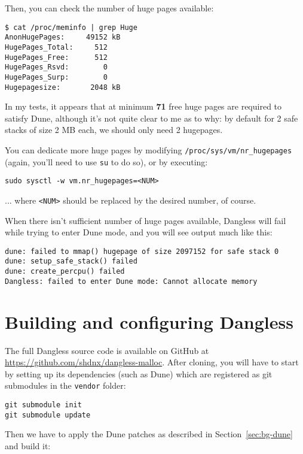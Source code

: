 Then, you can check the number of huge pages available:

\begin{verbatim}
$ cat /proc/meminfo | grep Huge
AnonHugePages:     49152 kB
HugePages_Total:     512
HugePages_Free:      512
HugePages_Rsvd:        0
HugePages_Surp:        0
Hugepagesize:       2048 kB
\end{verbatim}

In my tests, it appears that at minimum \textbf{71} free huge pages are required to satisfy Dune, although it's not quite clear to me as to why: by default for 2 safe stacks of size 2 MB each, we should only need 2 hugepages.

You can dedicate more huge pages by modifying \texttt{/proc/sys/vm/nr\_hugepages} (again, you'll need to use \texttt{su} to do so), or by executing:

\begin{verbatim}
sudo sysctl -w vm.nr_hugepages=<NUM>
\end{verbatim}

... where \texttt{<NUM>} should be replaced by the desired number, of course.

When there isn't sufficient number of huge pages available, Dangless will fail while trying to enter Dune mode, and you will see output much like this:

\begin{verbatim}
dune: failed to mmap() hugepage of size 2097152 for safe stack 0
dune: setup_safe_stack() failed
dune: create_percpu() failed
Dangless: failed to enter Dune mode: Cannot allocate memory
\end{verbatim}

\section{Building and configuring Dangless}

The full Dangless source code is available on GitHub at \url{https://github.com/shdnx/dangless-malloc}. After cloning, you will have to start by setting up its dependencies (such as Dune) which are registered as git submodules in the \texttt{vendor} folder:

\begin{verbatim}
git submodule init
git submodule update
\end{verbatim}

Then we have to apply the Dune patches as described in Section~\ref{sec:bg-dune} and build it:

